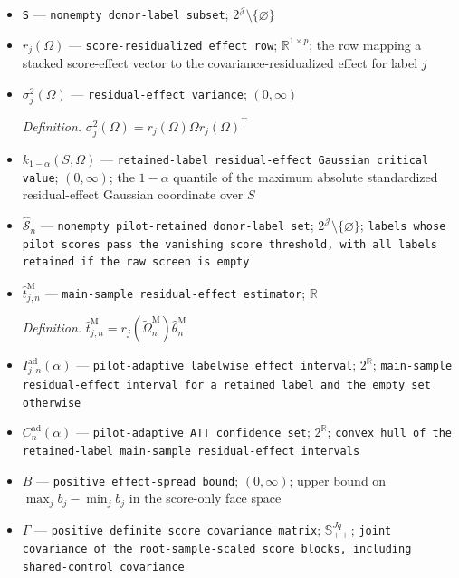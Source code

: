 \documentclass{article}
\begin{document}
\begin{itemize}
  \item \texttt{S} --- \texttt{nonempty donor-\allowbreak{}label subset}; \(2^{\mathcal J}\setminus\{\varnothing\}\)
  \item \(r_j(\Omega)\) --- \texttt{score-\allowbreak{}residualized effect row}; \(\mathbb R^{1\times p}\); the row mapping a stacked score-effect vector to the covariance-residualized effect for label \(j\)
  \item \(\sigma_j^2(\Omega)\) --- \texttt{residual-\allowbreak{}effect variance}; \((0,\infty)\)
  \par\smallskip\noindent\emph{Definition.} \(\sigma_j^2(\Omega)=r_j(\Omega)\Omega r_j(\Omega)^{\top}\)
  \item \(k_{1-\alpha}(S,\Omega)\) --- \texttt{retained-\allowbreak{}label residual-\allowbreak{}effect Gaussian critical value}; \((0,\infty)\); the \(1-\alpha\) quantile of the maximum absolute standardized residual-effect Gaussian coordinate over \(S\)
  \item \(\widehat{\mathcal S}_n\) --- \texttt{nonempty pilot-\allowbreak{}retained donor-\allowbreak{}label set}; \(2^{\mathcal J}\setminus\{\varnothing\}\); \texttt{labels whose pilot scores pass the vanishing score threshold,\allowbreak{} with all labels retained if the raw screen is empty}
  \item \(\widehat t_{j,n}^{\mathrm M}\) --- \texttt{main-\allowbreak{}sample residual-\allowbreak{}effect estimator}; \(\mathbb R\)
  \par\smallskip\noindent\emph{Definition.} \(\widehat t_{j,n}^{\mathrm M}=r_j(\widetilde\Omega_n^{\mathrm M})\widehat\theta_n^{\mathrm M}\)
  \item \(I_{j,n}^{\mathrm{ad}}(\alpha)\) --- \texttt{pilot-\allowbreak{}adaptive labelwise effect interval}; \(2^{\mathbb R}\); \texttt{main-\allowbreak{}sample residual-\allowbreak{}effect interval for a retained label and the empty set otherwise}
  \item \(C_n^{\mathrm{ad}}(\alpha)\) --- \texttt{pilot-\allowbreak{}adaptive ATT confidence set}; \(2^{\mathbb R}\); \texttt{convex hull of the retained-\allowbreak{}label main-\allowbreak{}sample residual-\allowbreak{}effect intervals}
  \item \(B\) --- \texttt{positive effect-\allowbreak{}spread bound}; \((0,\infty)\); upper bound on \(\max_j b_j-\min_j b_j\) in the score-only face space
  \item \(\Gamma\) --- \texttt{positive definite score covariance matrix}; \(\mathbb S_{++}^{Jq}\); \texttt{joint covariance of the root-\allowbreak{}sample-\allowbreak{}scaled score blocks,\allowbreak{} including shared-\allowbreak{}control covariance}

\end{itemize}
\end{document}
